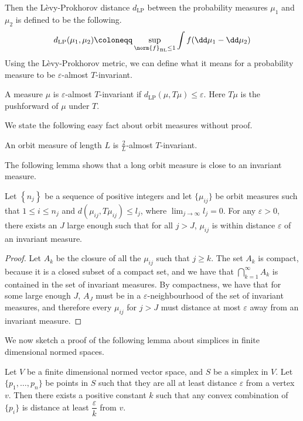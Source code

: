 \documentclass[12pt, reqno]{amsart}
\begin{document}
Then the Lèvy-Prokhorov distance $d_{\mathrm{LP}}$ between the probability measures $\mu_1$ and $\mu_2$ is defined to be the following.
\begin{align*}
  d_{\mathrm{LP}}(\mu_1, \mu_2) \coloneqq \sup_{\norm{f}_{\mathrm{BL}} \leq 1} \int f (\dd \mu_1 - \dd \mu_2)
\end{align*}
Using the Lèvy-Prokhorov metric, we can define what it means for a probability measure to be $\varepsilon$-almost $T$-invariant.
\begin{definition}
  A measure $\mu$ is $\varepsilon$-almost $T$-invariant if $d_{\mathrm{LP}}(\mu, T \mu) \leq \varepsilon$. Here $T \mu$ is the pushforward of $\mu$ under $T$.
\end{definition}
We state the following easy fact about orbit measures without proof.
\begin{fact}
  An orbit measure of length $L$ is $\frac{2}{L}$-almost $T$-invariant.
\end{fact}
The following lemma shows that a long orbit measure is close to an invariant measure.
\begin{lemma}
  \label{lem:long-orbit-is-almost-invariant}
  Let $\left\{ n_j \right\}$ be a sequence of positive integers and let $\{\mu_{ij}\}$ be orbit measures such that $1 \leq i \leq n_j$ and $d(\mu_{ij}, T{\mu}_{ij}) \leq l_j$, where $\lim_{j \to \infty} l_j = 0$.
  For any $\varepsilon > 0$, there exists an $J$ large enough such that for all $j > J$, $\mu_{ij}$ is within distance $\varepsilon$ of an invariant measure.
\end{lemma}
\begin{proof}
  Let $A_k$ be the closure of all the $\mu_{ij}$ such that $j \geq k$.
  The set $A_k$ is compact, because it is a closed subset of a compact set, and we have that $\bigcap_{k=1}^{\infty} A_k$ is contained in the set of invariant measures.
  By compactness, we have that for some large enough $J$, $A_J$ must be in a $\varepsilon$-neighbourhood of the set of invariant measures, and therefore every $\mu_{ij}$ for $j > J$ must distance at most $\varepsilon$ away from an invariant measure.
\end{proof}
We now sketch a proof of the following lemma about simplices in finite dimensional normed spaces.
\begin{lemma}
  \label{lem:finite-normed}
  Let $V$ be a finite dimensional normed vector space, and $S$ be a simplex in $V$.
  Let $\{p_1, \ldots, p_n\}$ be points in $S$ such that they are all at least distance $\varepsilon$ from a vertex $v$.
  Then there exists a positive constant $k$ such that any convex combination of $\{p_i\}$ is distance at least $\dfrac{\varepsilon}{k}$ from $v$.
\end{lemma}
\end{document}
